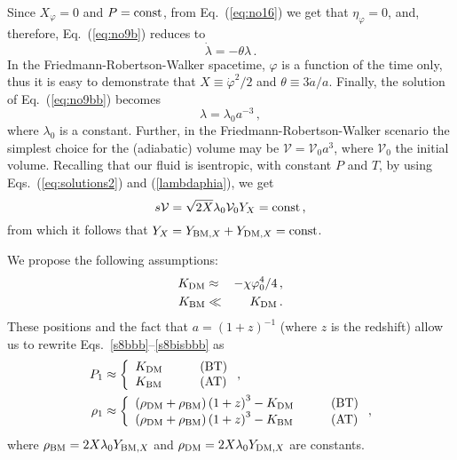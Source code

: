 \documentclass[twocolumn,showpacs, nofootinbib,aps,superscriptaddress, eqsecnum,prd,prl,notitlepage,showkeys,10pt,reprint]{revtex4-1}
\begin{document}
Since $X_\varphi=0$ and $P={\rm const}$, from Eq.~(\ref{eq:no16}) we get that $\eta_\varphi=0$, and, therefore, Eq.~(\ref{eq:no9b}) reduces to
%
\begin{equation}
\label{eq:no9bb}
\dot{\lambda} = - \theta\lambda\,.
\end{equation}
%
In the Friedmann-Robertson-Walker spacetime, $\varphi$ is a function of the time only, thus it is easy to demonstrate that $X\equiv\dot{\varphi}^2/2$ and $\theta\equiv 3\dot{a}/a$.
Finally, the solution of Eq.~(\ref{eq:no9bb}) becomes
%
\begin{equation}
\label{lambdaphia}
\lambda = \lambda_0 a^{-3}\,,
\end{equation}
%
where $\lambda_0$ is a constant.
Further, in the Friedmann-Robertson-Walker scenario the simplest choice for the (adiabatic) volume may be $\mathcal V=\mathcal V_0a^3$, where  $\mathcal V_0$ the initial volume. Recalling that our  fluid is isentropic, with constant $P$ and $T$, by using Eqs.~(\ref{eq:solutions2}) and (\ref{lambdaphia}), we get
%
\begin{equation}
\label{isentropic}
s\mathcal{V}=\sqrt{2X}\lambda_0\mathcal V_0 Y_X={\rm const}\,,
\end{equation}
%
from which it follows that $Y_X=Y_{{\rm BM},X}+Y_{{\rm DM},X}={\rm const}$.

We propose the following assumptions:
\begin{eqnarray}
K_{\rm DM}&\approx&-\chi\varphi_0^4/4\,,\\
K_{\rm BM}&\ll& K_{\rm DM}\,.
\end{eqnarray}
%
These positions and the fact that $a=(1+z)^{-1}$ (where $z$ is the redshift) allow us to rewrite Eqs.~\eqref{s8bbb}--\eqref{s8bisbbb} as
%
\begin{align}
\label{s8bbbb}
P_1&\approx \left\{
\begin{array}{ll}
K_{\rm DM}\quad&\quad{\rm (BT)}\\
K_{\rm BM}\quad&\quad{\rm (AT)}
\end{array}
\right.,\\
\label{s8bisbbbb}
\rho_1&\approx \left\{
\begin{array}{ll}
\left(\rho_{\rm DM}+\rho_{\rm BM}\right)\left(1+z\right)^3-K_{\rm DM}\quad &\quad{\rm (BT)}\\
\left(\rho_{\rm DM}+\rho_{\rm BM}\right)\left(1+z\right)^3-K_{\rm BM}\quad&\quad{\rm (AT)}
\end{array}
\right.,
\end{align}
%
where $\rho_{\rm BM}=2X\lambda_0Y_{{\rm BM},X}$ and $\rho_{\rm DM}=2X\lambda_0Y_{{\rm DM},X}$ are constants.
\end{document}
